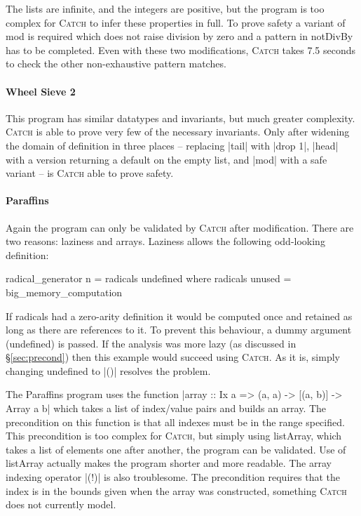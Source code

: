 \documentclass[preprint]{sigplanconf}
\newcommand{\C}[1]{\textsf{#1}}
\newcommand{\catch}{\textsc{Catch}}
\newcommand{\ignore}{}
\begin{document}
The lists are infinite, and the integers are positive, but the program is too complex for \catch{} to infer these properties in full. To prove safety a variant of \C{mod} is required which does not raise division by zero and a pattern in \C{notDivBy} has to be completed. Even with these two modifications, \catch{} takes 7.5 seconds to check the other non-exhaustive pattern matches.


\paragraph{Wheel Sieve 2}

This program has similar datatypes and invariants, but much greater complexity. \catch{} is able to prove very few of the necessary invariants. Only after widening the domain of definition in three places -- replacing |tail| with |drop 1|, |head| with a version returning a default on the empty list, and |mod| with a safe variant -- is \catch{} able to prove safety.


\paragraph{Paraffins}

Again the program can only be validated by \catch{} after modification. There are two reasons: laziness and arrays. Laziness allows the following odd-looking definition:

\begin{comment}
\begin{code}
big_memory_computation = undefined
\end{code}
\end{comment}

\begin{code}
radical_generator n = radicals undefined
  where radicals unused = big_memory_computation
\end{code}

If \C{radicals} had a zero-arity definition it would be computed once and retained as long as there are references to it. To prevent this behaviour, a dummy argument (\C{undefined}) is passed. If the analysis was more lazy (as discussed in \S\ref{sec:precond}) then this example would succeed using \catch{}. As it is, simply changing \C{undefined} to |()| resolves the problem.

The Paraffins program uses the function \ignore|array :: Ix a => (a, a) -> [(a, b)] -> Array a b| which takes a list of index/value pairs and builds an array. The precondition on this function is that all indexes must be in the range specified. This precondition is too complex for \catch{}, but simply using \C{listArray}, which takes a list of elements one after another, the program can be validated. Use of \C{listArray} actually makes the program shorter and more readable. The array indexing operator \ignore|(!)| is also troublesome. The precondition requires that the index is in the bounds given when the array was constructed, something \catch{} does not currently model.
\end{document}
